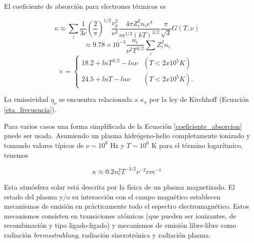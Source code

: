 El coeficiente de absorci\'on para electrones t\'ermicos es

\begin{equation*} \label{coeficiente1}
\kappa \approx \sum_{i} \frac{1}{3c} (\frac{2}{\pi})^{1/2} \frac{\nu_p^2}{\nu^2} \frac{4\pi Z_i^2 n_i e^4}{m^{1/2}(kT)^{3/2}} \frac{\pi}{\sqrt{3}}G(T,\nu)
\end{equation*}
\begin{equation*} \label{coeficiente2}
\approx 9.78 \times 10^{-3} \frac{n_e}{\nu^2T^{3/2}} \sum_i Z_i^2 n_i
\end{equation*}
\begin{equation} \label{coeficiente_absorcion}
\times =
    \begin{cases}
    18.2+ln T^{3/2}-ln\nu    & (T < 2 x 10^5 K)\\
    24.5+lnT-ln\nu           & (T < 2 x 10^5 K).
    \end{cases}
\end{equation}


La emissividad $\eta_\nu$ se encuentra relacionada a $\kappa_\nu$ por la ley de Kirchhoff (Ecuaci\'on \ref{eta_frecuencia}).

Para varios casos una forma simplificada de la Ecuaci\'on \ref{coeficiente_absorcion} puede ser usada. Asumiendo un plasma hidr\'ogeno-helio completamente ionizado y tomando valores t\'ipicos de $\nu \sim 10^8$ Hz y $T \sim 10^6$ K para el t\'ermino logar\'itmico, tenemos

\begin{equation} \label{coeficiente_absorcion_simple}
\kappa \approx 0.2 n_e^2T^{-3/2} \nu^{-2} cm^{-1}
\end{equation}

Esta atm\'osfera solar est\'a descrita por la f\'isica de un plasma magnetizado. El estado del plasma y/o su interacci\'on con el campo magn\'etico establecen mecanismos de emisi\'on en pr\'acticamente todo el espectro electromagn\'etico. Estos mecanismos consisten en transiciones at\'omicas (que pueden ser ionizantes, de recombinaci\'on y tipo ligado-ligado) y mecanismos de emisi\'on libre-libre como radiaci\'on \emph{bremsstrahlung}, radiaci\'on sincrotr\'onica y radiaci\'on plasma.  ~\citep{ashwanden}

